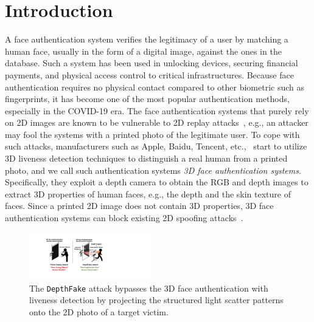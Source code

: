 \section{Introduction}
A face authentication system verifies the legitimacy of a user by matching a human face, usually in the form of a digital image, against the ones in the database. Such a system has been used in unlocking devices, securing financial payments, and physical access control to critical infrastructures. Because face authentication requires no physical contact compared to other biometric such as fingerprints, it has become one of the most popular authentication methods, especially in the COVID-19 era. The face authentication systems that purely rely on 2D images are known to be vulnerable to 2D replay attacks~\cite{chakka2011competition,anjos2011counter,raghavendra2015presentation}, e.g., an attacker may fool the systems with a printed photo of the legitimate user.
To cope with such attacks, manufacturers such as Apple, Baidu, Tencent, etc.,~\cite{faceid, baidu, tencent} start to utilize 3D liveness detection techniques to distinguish a real human from a printed photo, and we call such authentication systems \textit{3D face authentication systems}. Specifically, they exploit a depth camera to obtain the RGB and depth images to extract 3D properties of human faces, e.g., the depth and the skin texture of faces. Since a printed 2D image does not contain 3D properties, 3D face authentication systems can block existing 2D spoofing attacks~\cite{souza2018far, marcel2014handbook}.




\begin{figure}[t]
	\centerline{\includegraphics[width = 0.48\textwidth]{figures/intro.pdf}}
	\vspace{-0.1in}
	\caption{The \texttt{DepthFake} attack bypasses the 3D face authentication with liveness detection by projecting the structured light scatter patterns onto the 2D photo of a target victim.}
	\label{intro}
	\vspace{-0.2in}
\end{figure}

